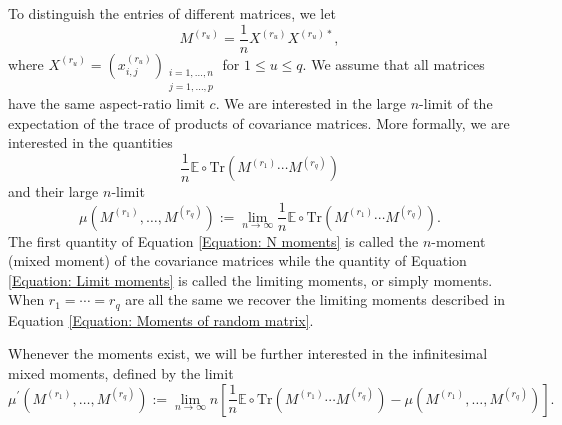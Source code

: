 \documentclass{article}
\theoremstyle{definition}
\newcommand{\E}{\mathbb{E}}
\newcommand{\Tr}{\text{Tr}}
\begin{document}
To distinguish the entries of different matrices, we let
$$M^{(r_u)}=\frac{1}{n}X^{(r_u)}X^{(r_u)*},$$
where $X^{(r_u)}=(x_{i,j}^{(r_u)})_{\substack{i=1,\dots,n \\ j=1,\dots,p}}$ for $1\leq u\leq q$. We assume that all matrices have the same aspect-ratio limit $c$.
We are interested in the large $n$-limit of the expectation of the trace of products of covariance matrices. More formally, we are interested in the quantities
\begin{equation}\label{Equation: N moments}
\frac{1}{n}\E\circ \Tr(M^{(r_1)}\cdots M^{(r_q)})
\end{equation}
and their large $n$-limit
\begin{equation}\label{Equation: Limit moments}
\mu(M^{(r_1)},\dots, M^{(r_q)}) := \lim_{n\rightarrow\infty}\frac{1}{n}\E\circ \Tr(M^{(r_1)}\cdots M^{(r_q)}).
\end{equation}
The first quantity of Equation \ref{Equation: N moments} is called the $n$-moment (mixed moment) of the covariance matrices while the quantity of Equation \ref{Equation: Limit moments} is called the limiting moments, or simply moments. When $r_1=\cdots =r_q$ are all the same we recover the limiting moments described in Equation \ref{Equation: Moments of random matrix}.

Whenever the moments exist, we will be further interested in the infinitesimal mixed moments, defined by the limit
\begin{equation}\label{Equation: Limit inf moments}
\mu^\prime(M^{(r_1)},\dots, M^{(r_q)}) := \lim_{n\rightarrow\infty} n\left[\frac{1}{n}\E\circ \Tr(M^{(r_1)}\cdots M^{(r_q)})-\mu(M^{(r_1)},\dots, M^{(r_q)})\right].
\end{equation}

\end{document}
